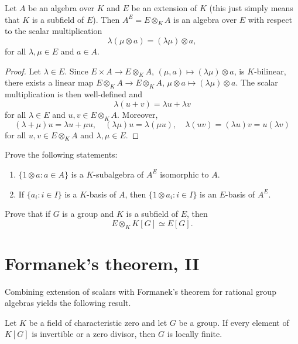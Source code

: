 \begin{theorem}
\label{thm:extensions_scalars}
	Let $A$ be an algebra over $K$ and $E$ be an extension of $K$ (this just simply means that
	$K$ is a subfield of $E$). Then 
	$A^E=E\otimes_KA$ is an algebra over $E$ with respect to
	the scalar multiplication 
	\[
		\lambda(\mu\otimes a)=(\lambda\mu)\otimes a,
	\]
	for all $\lambda,\mu\in E$ and $a\in A$.
\end{theorem}

\begin{proof}
	Let $\lambda\in E$. Since $E\times A\to E\otimes_KA$,
	$(\mu,a)\mapsto (\lambda\mu)\otimes a$, is $K$-bilinear, there exists 
	a linear map $E\otimes_KA\to E\otimes_KA$, $\mu\otimes a\mapsto
	(\lambda\mu)\otimes a$. The scalar multiplication is then well-defined and 
	\[
	\lambda(u+v)=\lambda u+\lambda v
	\]
	for all $\lambda\in E$ and $u,v\in E\otimes_KA$. Moreover, 
	\[
	(\lambda+\mu)u=\lambda u+\mu u,
	\quad
	(\lambda\mu)u=\lambda(\mu u),
	\quad
	\lambda(uv)=(\lambda u)v=u(\lambda v)
	\]
	for all $u,v\in E\otimes_KA$ and $\lambda,\mu\in E$.
\end{proof}

\begin{exercise}
    Prove the following statements:
    \begin{enumerate}
		\item $\{1\otimes a:a\in A\}$ 
		is a $K$-subalgebra of $A^E$ isomorphic to $A$.
		\item If $\{a_i:i\in I\}$ is a $K$-basis of $A$, then $\{1\otimes a_i:i\in
			I\}$ is an $E$-basis of $A^E$.
	\end{enumerate}
\end{exercise}

\begin{exercise}
	Prove that if $G$ is a group and $K$ is a subfield of $E$, then
	\[
	E\otimes_K K[G]\simeq E[G].
	\]
\end{exercise}

\section{Formanek's theorem, II}

Combining extension of scalars with Formanek's theorem for rational group algebras yields the following result.

\begin{theorem}[Formanek]
	Let $K$ be a field of characteristic zero and let $G$ be a group. 
	If every element of $K[G]$ is invertible or a zero divisor, 
	then $G$ is locally finite. 
\end{theorem}

